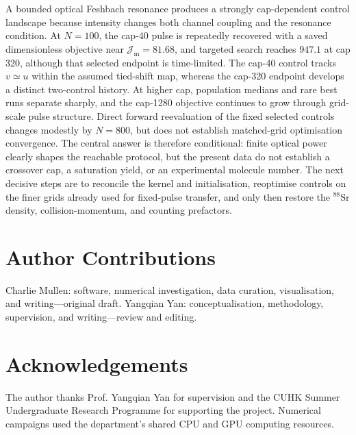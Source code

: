 \documentclass[9pt,a4paper,twocolumn,twoside]{rho-class/rho}
\newcommand{\Jmol}{\mathcal{J}_{\mathrm{m}}}
\newcommand{\ShowcaseFortyObjective}{81.68}%
\newcommand{\ShowcaseThreeTwentyObjective}{947.1}%
\begin{document}
    A bounded optical Feshbach resonance produces a strongly cap-dependent
    control landscape because intensity changes both channel coupling and the
    resonance condition. At $N=100$, the cap-40 pulse is repeatedly recovered
    with a saved dimensionless objective near
    $\Jmol=\ShowcaseFortyObjective$, and targeted search reaches
    $\ShowcaseThreeTwentyObjective$ at cap 320, although that selected endpoint
    is time-limited. The cap-40 control tracks $v\simeq u$ within the assumed
    tied-shift map, whereas the cap-320 endpoint develops a distinct two-control
    history. At higher cap,
    population medians and rare best runs separate sharply, and the cap-1280
    objective continues to grow through grid-scale pulse structure. Direct
    forward reevaluation of the fixed selected controls changes modestly by
    $N=800$, but does not establish matched-grid optimisation convergence. The central
    answer is therefore conditional: finite optical power clearly shapes the
    reachable protocol, but the present data do not establish a crossover cap,
    a saturation yield, or an experimental molecule number. The next decisive
    steps are to reconcile the kernel and initialisation, reoptimise controls
    on the finer grids already used for fixed-pulse transfer, and only then restore the
    $^{88}\mathrm{Sr}$ density, collision-momentum, and counting prefactors.

\section*{Author Contributions}

    Charlie Mullen: software, numerical investigation, data curation,
    visualisation, and writing---original draft. Yangqian Yan:
    conceptualisation, methodology, supervision, and writing---review and
    editing.

\section*{Acknowledgements}

    The author thanks Prof. Yangqian Yan for supervision and the CUHK Summer
    Undergraduate Research Programme for supporting the project. Numerical
    campaigns used the department's shared CPU and GPU computing resources.
\end{document}
